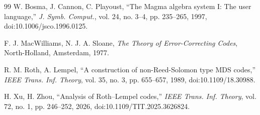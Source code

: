﻿\documentclass[11pt]{article}
\theoremstyle{plain}
\theoremstyle{definition}
\begin{document}
\begin{thebibliography}{99}
W. Bosma, J. Cannon, C. Playoust,
``The Magma algebra system I: The user language,''
\emph{J. Symb. Comput.}, vol. 24, no. 3--4, pp. 235--265, 1997,
doi:10.1006/jsco.1996.0125.

F. J. MacWilliams, N. J. A. Sloane,
\emph{The Theory of Error-Correcting Codes},
North-Holland, Amsterdam, 1977.

R. M. Roth, A. Lempel,
``A construction of non-Reed-Solomon type MDS codes,''
\emph{IEEE Trans. Inf. Theory}, vol. 35, no. 3, pp. 655--657, 1989,
doi:10.1109/18.30988.

H. Xu, H. Zhou,
``Analysis of Roth--Lempel codes,''
\emph{IEEE Trans. Inf. Theory}, vol. 72, no. 1, pp. 246--252, 2026,
doi:10.1109/TIT.2025.3626824.

\end{thebibliography}
\endgroup
\end{document}
